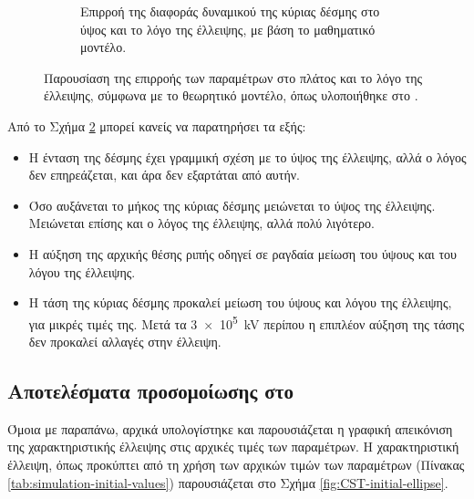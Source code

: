 \begin{figure}[tph]
\begin{subfigure}{0.47\textwidth}
		\centering
		\caption{Επιρροή της διαφοράς δυναμικού της κύριας δέσμης στο ύψος και το λόγο της έλλειψης, με βάση το μαθηματικό μοντέλο.}
		\label{fig:EBS-variables-voltage-linear}
	\end{subfigure}
\caption{Παρουσίαση της επιρροής των παραμέτρων στο πλάτος και το λόγο της έλλειψης, σύμφωνα με το θεωρητικό μοντέλο, όπως υλοποιήθηκε στο .}	
\label{fig:EBS-MATLAB-variables}
\end{figure}

Από το Σχήμα \ref{fig:EBS-MATLAB-variables} μπορεί κανείς να παρατηρήσει τα εξής:
\begin{itemize}
\item Η ένταση της δέσμης έχει γραμμική σχέση με το ύψος της έλλειψης, αλλά ο λόγος δεν επηρεάζεται, και άρα δεν εξαρτάται από αυτήν.
\item Όσο αυξάνεται το μήκος της κύριας δέσμης μειώνεται το ύψος της έλλειψης.
Μειώνεται επίσης και ο λόγος της έλλειψης, αλλά πολύ λιγότερο.
\item Η αύξηση της αρχικής θέσης ριπής οδηγεί σε ραγδαία μείωση του ύψους και του λόγου της έλλειψης.
\item Η τάση της κύριας δέσμης προκαλεί μείωση του ύψους και λόγου της έλλειψης, για μικρές τιμές της. 
Μετά τα \SI{3e5}{\kilo \volt} περίπου η επιπλέον αύξηση της τάσης δεν προκαλεί αλλαγές στην έλλειψη.
\end{itemize}


\subsection{Αποτελέσματα προσομοίωσης στο }

Όμοια με παραπάνω, αρχικά υπολογίστηκε και παρουσιάζεται η γραφική απεικόνιση της χαρακτηριστικής έλλειψης στις αρχικές τιμές των παραμέτρων.
Η χαρακτηριστική έλλειψη, όπως προκύπτει από τη χρήση των αρχικών τιμών των παραμέτρων (Πίνακας \ref{tab:simulation-initial-values}) παρουσιάζεται στο Σχήμα \ref{fig:CST-initial-ellipse}.

